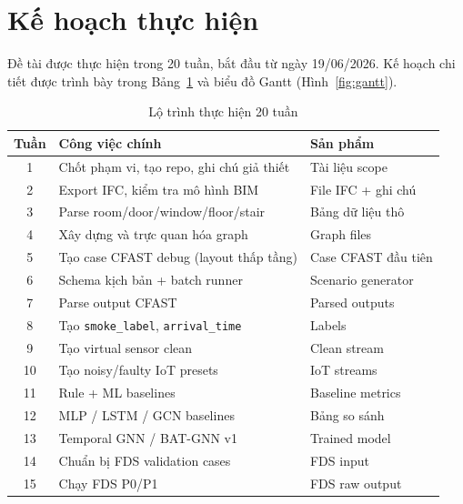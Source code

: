 \section{Kế hoạch thực hiện}
\label{sec:kehoachthuchien}

Đề tài được thực hiện trong 20 tuần, bắt đầu từ ngày 19/06/2026. Kế hoạch chi tiết được trình bày trong Bảng~\ref{tab:roadmap} và biểu đồ Gantt (Hình~\ref{fig:gantt}).

\begin{table}[H]
\centering
\caption{Lộ trình thực hiện 20 tuần}
\label{tab:roadmap}
\begin{tabularx}{\textwidth}{c X X}
\toprule
\textbf{Tuần} & \textbf{Công việc chính} & \textbf{Sản phẩm} \\
\midrule
1  & Chốt phạm vi, tạo repo, ghi chú giả thiết         & Tài liệu scope \\
2  & Export IFC, kiểm tra mô hình BIM                    & File IFC + ghi chú \\
3  & Parse room/door/window/floor/stair                  & Bảng dữ liệu thô \\
4  & Xây dựng và trực quan hóa graph                    & Graph files \\
5  & Tạo case CFAST debug (layout thấp tầng)             & Case CFAST đầu tiên \\
6  & Schema kịch bản + batch runner                      & Scenario generator \\
7  & Parse output CFAST                                  & Parsed outputs \\
8  & Tạo \texttt{smoke\_label}, \texttt{arrival\_time}   & Labels \\
9  & Tạo virtual sensor clean                            & Clean stream \\
10 & Tạo noisy/faulty IoT presets                        & IoT streams \\
11 & Rule + ML baselines                                 & Baseline metrics \\
12 & MLP / LSTM / GCN baselines                          & Bảng so sánh \\
13 & Temporal GNN / BAT-GNN v1                           & Trained model \\
14 & Chuẩn bị FDS validation cases                       & FDS input \\
15 & Chạy FDS P0/P1                                      & FDS raw output \\

\end{tabularx}
\end{table}
